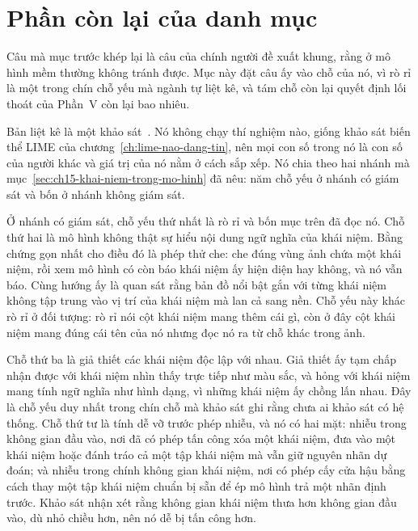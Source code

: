 \section{Phần còn lại của danh mục}
\label{sec:ch15-phan-con-lai}

%
Câu mà mục trước khép lại là câu của chính người đề xuất khung, rằng
 ở mô hình mềm thường không tránh được. Mục này đặt câu ấy
vào chỗ của nó, vì rò rỉ là
một trong chín chỗ yếu mà ngành tự liệt kê, và tám chỗ còn lại quyết định lối
thoát của Phần~V còn lại bao nhiêu.

Bản liệt kê là một khảo sát~\autocite{p31cbmrisks}. Nó không chạy thí nghiệm
nào, giống khảo sát biến thể LIME của
chương~\ref{ch:lime-nao-dang-tin}, nên mọi con số trong nó là con số của người
khác và giá trị của nó nằm ở cách sắp xếp. Nó chia theo hai nhánh mà
mục~\ref{sec:ch15-khai-niem-trong-mo-hinh} đã nêu: năm chỗ yếu ở nhánh có giám
sát và bốn ở nhánh không giám sát.

%
Ở nhánh có giám sát, chỗ yếu thứ nhất là rò rỉ và bốn mục trên đã đọc nó. Chỗ
thứ hai là mô hình không thật sự hiểu nội dung ngữ nghĩa của khái niệm. Bằng
chứng gọn nhất cho điều đó là phép thử che: che đúng vùng ảnh chứa một khái
niệm, rồi xem mô hình có còn báo khái niệm ấy hiện diện hay không, và nó vẫn báo.
Cùng hướng ấy là quan sát rằng bản đồ nổi bật gắn với từng khái niệm không tập
trung vào vị trí của khái niệm mà lan cả sang nền. Chỗ yếu này khác rò rỉ ở đối
tượng: rò rỉ nói cột khái niệm mang thêm cái gì, còn ở đây cột khái niệm mang
đúng cái tên của nó nhưng đọc nó ra từ chỗ khác trong ảnh.

%
Chỗ thứ ba là giả thiết các khái niệm độc lập với nhau. Giả thiết ấy tạm chấp
nhận được với khái niệm nhìn thấy trực tiếp như màu sắc, và hỏng với khái niệm
mang tính ngữ nghĩa như hình dạng, vì những khái niệm ấy chồng lấn nhau. Đây là
chỗ yếu duy nhất trong chín chỗ mà khảo sát ghi rằng chưa ai khảo sát có hệ
thống. Chỗ thứ tư là tính dễ vỡ trước phép nhiễu, và nó có hai mặt: nhiễu trong
không gian đầu vào, nơi đã có phép tấn công xóa một khái niệm, đưa vào một khái
niệm hoặc đánh tráo cả một tập khái niệm mà vẫn giữ nguyên nhãn dự đoán; và
nhiễu trong chính không gian khái niệm, nơi có phép cấy cửa hậu bằng cách thay
một tập khái niệm chuẩn bị sẵn để ép mô hình trả một nhãn định trước. Khảo sát
nhận xét rằng không gian khái niệm thưa hơn không gian đầu vào, dù nhỏ chiều
hơn, nên nó dễ bị tấn công hơn.


